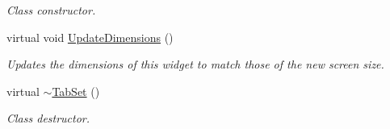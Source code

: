 \begin{DoxyCompactItemize}
\begin{DoxyCompactList}\small\item\em Class constructor. \item\end{DoxyCompactList}\item 
virtual void \hyperlink{classMezzanine_1_1UI_1_1TabSet_a191f67ec19fc80f63eb842305f8cfb05}{UpdateDimensions} ()
\begin{DoxyCompactList}\small\item\em Updates the dimensions of this widget to match those of the new screen size. \item\end{DoxyCompactList}\item 
\hypertarget{classMezzanine_1_1UI_1_1TabSet_aefeb37272d3019a728fcf93232831ab9}{
virtual \hyperlink{classMezzanine_1_1UI_1_1TabSet_aefeb37272d3019a728fcf93232831ab9}{$\sim$TabSet} ()}
\label{classMezzanine_1_1UI_1_1TabSet_aefeb37272d3019a728fcf93232831ab9}

\begin{DoxyCompactList}\small\item\em Class destructor. \item\end{DoxyCompactList}\end{DoxyCompactItemize}
